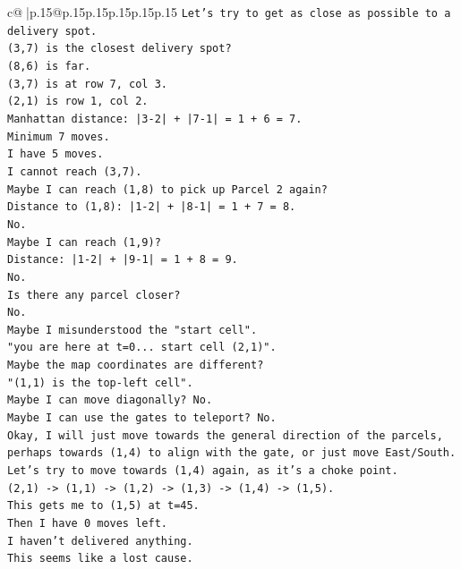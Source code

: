 \documentclass{article}
\begin{document}
{\begin{supertabular}{c@{$\;$}|p{.15\linewidth}@{}p{.15\linewidth}p{.15\linewidth}p{.15\linewidth}p{.15\linewidth}p{.15\linewidth}}
{{{\texttt{Let's try to get as close as possible to a delivery spot.} \\
\texttt{(3,7) is the closest delivery spot?} \\
\texttt{(8,6) is far.} \\
\texttt{(3,7) is at row 7, col 3.} \\
\texttt{(2,1) is row 1, col 2.} \\
\texttt{Manhattan distance: |3{-}2| + |7{-}1| = 1 + 6 = 7.} \\
\texttt{Minimum 7 moves.} \\
\texttt{I have 5 moves.} \\
\texttt{I cannot reach (3,7).} \\
\texttt{Maybe I can reach (1,8) to pick up Parcel 2 again?} \\
\texttt{Distance to (1,8): |1{-}2| + |8{-}1| = 1 + 7 = 8.} \\
\texttt{No.} \\
\texttt{Maybe I can reach (1,9)?} \\
\texttt{Distance: |1{-}2| + |9{-}1| = 1 + 8 = 9.} \\
\texttt{No.} \\
\texttt{Is there any parcel closer?} \\
\texttt{No.} \\
\texttt{Maybe I misunderstood the "start cell".} \\
\texttt{"you are here at t=0... start cell (2,1)".} \\
\texttt{Maybe the map coordinates are different?} \\
\texttt{"(1,1) is the top{-}left cell".} \\
\texttt{Maybe I can move diagonally? No.} \\
\texttt{Maybe I can use the gates to teleport? No.} \\
\texttt{Okay, I will just move towards the general direction of the parcels, perhaps towards (1,4) to align with the gate, or just move East/South.} \\
\texttt{Let's try to move towards (1,4) again, as it's a choke point.} \\
\texttt{(2,1) {-}> (1,1) {-}> (1,2) {-}> (1,3) {-}> (1,4) {-}> (1,5).} \\
\texttt{This gets me to (1,5) at t=45.} \\
\texttt{Then I have 0 moves left.} \\
\texttt{I haven't delivered anything.} \\
\texttt{This seems like a lost cause.} \\
}}}
\end{supertabular}}
\end{document}
